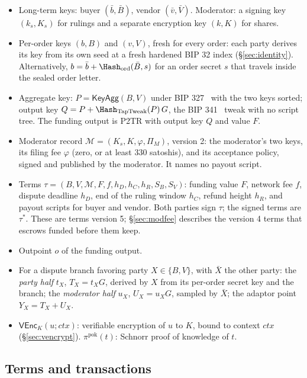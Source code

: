 \begin{itemize}
  \item Long-term keys: buyer $(\bar b,\bar B)$, vendor $(\bar v,\bar V)$. Moderator: a signing key $(k_s,K_s)$ for rulings and a separate encryption key $(k,K)$ for shares.
  \item Per-order keys $(b,B)$ and $(v,V)$, fresh for every order: each party derives its key from its own seed at a fresh hardened BIP 32 index (\S\ref{sec:identity}). Alternatively, $b=\bar b+\Hash_{\mathrm{ord}}(\bar B,s)$ for an order secret $s$ that travels inside the sealed order letter.
  \item Aggregate key: $P=\mathsf{KeyAgg}(B,V)$ under BIP 327~\citep{bip327} with the two keys sorted; output key $Q=P+\Hash_{\mathrm{TapTweak}}(P)\,G$, the BIP 341~\citep{bip341} tweak with no script tree. The funding output is P2TR with output key $Q$ and value $F$.
  \item Moderator record $\mathcal{M}=(K_s,K,\varphi,\Pi_M)$, version 2: the moderator's two keys, its filing fee $\varphi$ (zero, or at least 330 satoshis), and its acceptance policy, signed and published by the moderator. It names no payout script.
  \item Terms $\tau=(B,V,\mathcal{M},F,f,h_D,h_C,h_R,S_B,S_V)$: funding value $F$, network fee $f$, dispute deadline $h_D$, end of the ruling window $h_C$, refund height $h_R$, and payout scripts for buyer and vendor. Both parties sign $\tau$; the signed terms are $\tau^\ast$. These are terms version 5; \S\ref{sec:modfee} describes the version 4 terms that escrows funded before them keep.
  \item Outpoint $o$ of the funding output.
  \item For a dispute branch favoring party $X\in\{B,V\}$, with $\bar X$ the other party: the \emph{party half} $t_X$, $T_X=t_XG$, derived by $X$ from its per-order secret key and the branch; the \emph{moderator half} $u_X$, $U_X=u_XG$, sampled by $\bar X$; the adaptor point $Y_X=T_X+U_X$.
  \item $\mathsf{VEnc}_K(u;\mathit{ctx})$: verifiable encryption of $u$ to $K$, bound to context $\mathit{ctx}$ (\S\ref{sec:vencrypt}). $\pi^{\mathrm{pok}}(t)$: Schnorr proof of knowledge of $t$.
\end{itemize}



\subsection{Terms and transactions}

